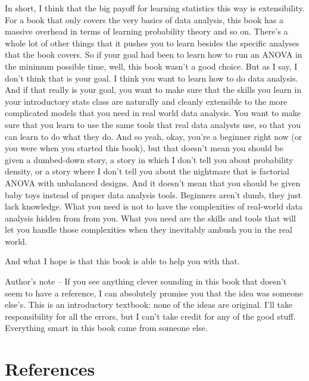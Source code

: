 \documentclass[
  a4paper,
]{book}
\begin{document}
In short, I think that the big payoff for learning statistics this way
is extensibility. For a book that only covers the very basics of data
analysis, this book has a massive overhead in terms of learning
probability theory and so on. There's a whole lot of other things that
it pushes you to learn besides the specific analyses that the book
covers. So if your goal had been to learn how to run an ANOVA in the
minimum possible time, well, this book wasn't a good choice. But as I
say, I don't think that is your goal. I think you want to learn how to
do data analysis. And if that really is your goal, you want to make sure
that the skills you learn in your introductory stats class are naturally
and cleanly extensible to the more complicated models that you need in
real world data analysis. You want to make sure that you learn to use
the same tools that real data analysts use, so that you can learn to do
what they do. And so yeah, okay, you're a beginner right now (or you
were when you started this book), but that doesn't mean you should be
given a dumbed-down story, a story in which I don't tell you about
probability density, or a story where I don't tell you about the
nightmare that is factorial ANOVA with unbalanced designs. And it
doesn't mean that you should be given baby toys instead of proper data
analysis tools. Beginners aren't dumb, they just lack knowledge. What
you need is not to have the complexities of real-world data analysis
hidden from from you. What you need are the skills and tools that will
let you handle those complexities when they inevitably ambush you in the
real world.

And what I hope is that this book is able to help you with that.

Author's note -- If you see anything clever sounding in this book that
doesn't seem to have a reference, I can absolutely promise you that the
idea was someone else's. This is an introductory textbook: none of the
ideas are original. I'll take responsibility for all the errors, but I
can't take credit for any of the good stuff. Everything smart in this
book came from someone else.


\hypertarget{references}{%
\chapter*{References}\label{references}}

\end{document}
